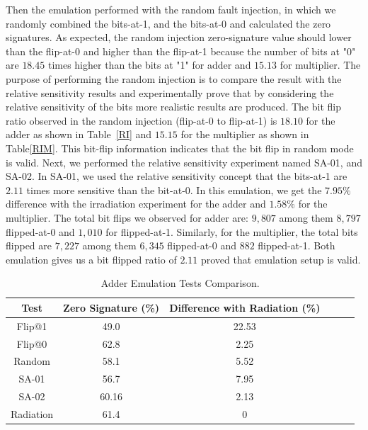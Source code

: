 Then the emulation performed with the random fault injection, in which we randomly combined the bits-at-1, and the bits-at-0 and calculated the zero signatures. As expected, the random injection zero-signature value should lower than the flip-at-0 and higher than the flip-at-1 because the number of bits at "0" are $18.45$ times higher than the bits at "1" for adder and  $15.13$ for multiplier. The purpose of performing the random injection is to compare the result with the relative sensitivity results and experimentally prove that by considering the relative sensitivity of the bits more realistic results are produced. The bit flip ratio observed in the random injection (flip-at-0 to flip-at-1) is $18.10$ for the adder as shown in Table~\ref{RI} and $15.15$ for the multiplier as shown in Table\ref{RIM}. This bit-flip information indicates that the bit flip in random mode is valid. Next, we performed the relative sensitivity experiment named SA-01, and SA-02.
In SA-01, we used the relative sensitivity concept that the  bits-at-1 are $2.11$ times more sensitive than the bit-at-0. In this emulation, we get the $7.95\%$ difference with the irradiation experiment for the adder and $1.58\%$ for the multiplier. The total bit flips we observed for adder are: $9,807$ among them $8,797$ flipped-at-0 and $1,010$ for flipped-at-1. Similarly, for the multiplier, the total bits flipped are $7,227$ among them $6,345$ flipped-at-0 and $882$ flipped-at-1. Both emulation gives us a bit flipped ratio of $2.11$ proved that emulation setup is valid. 





\begin{table}[tb!]
\center
\caption{Adder Emulation Tests Comparison.}
\label{AE}
\begin{tabular}{|c | c| c | c| c| c |} 
 \hline
Test & Zero Signature (\%) & Difference with Radiation (\%)   \\ 
\hline
 
 
 Flip@1& 49.0 &22.53   \\
 \hline
 Flip@0 & 62.8 & 2.25 \\ 
 \hline
 
 Random & 58.1 & 5.52  \\
 \hline
 SA-01 & 56.7 & 7.95 \\
 \hline
 SA-02 & 60.16 & 2.13  \\
 \hline
 Radiation & 61.4 & 0  \\
 \hline
 
 
\end{tabular}
\end{table}

